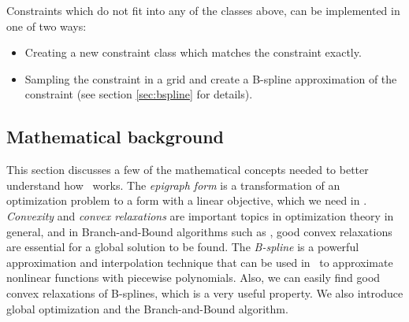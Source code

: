 Constraints which do not fit into any of the classes above, can be implemented in one of two ways:
\begin{itemize}
\item
Creating a new constraint class which matches the constraint exactly.
\item
Sampling the constraint in a grid and create a B-spline approximation of the constraint (see section \ref{sec:bspline} for details).
\end{itemize}

\subsection{Mathematical background}
\label{sec:mathematicalbakground}
This section discusses a few of the mathematical concepts needed to better understand how \solvername\ works. The \emph{epigraph form} is a transformation of an optimization problem to a form with a linear objective, which we need in \solvername. \emph{Convexity} and \emph{convex relaxations} are important topics in optimization theory in general, and in Branch-and-Bound algorithms such as \solvername, good convex relaxations are essential for a global solution to be found. The \emph{B-spline} is a powerful approximation and interpolation technique that can be used in \solvername\ to approximate nonlinear functions with piecewise polynomials. Also, we can easily find good convex relaxations of B-splines, which is a very useful property. We also introduce global optimization and the Branch-and-Bound algorithm.

